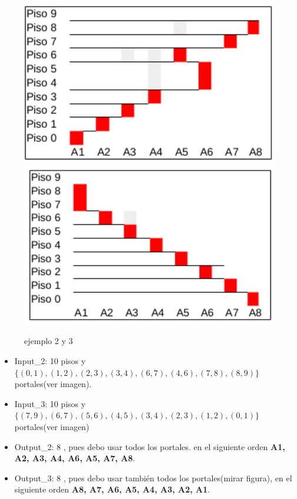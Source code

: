 \begin{figure}[H]
   \centering 
      \includegraphics[scale=0.25]{imagenes/problema1Imagen2.jpg}
      \includegraphics[scale=0.25]{imagenes/problema1Imagen3.jpg}
 \caption{ejemplo 2 y 3}
\end{figure}



\begin{itemize}
    \item Input_2: 10 pisos y $\{(0,1),(1,2),(2,3),(3,4),(6,7),(4,6),(7,8),(8,9)\}$ portales(ver imagen). 
    \item Input_3: 10 pisos y $\{(7,9),(6,7),(5,6),(4,5),(3,4),(2,3),(1,2),(0,1)\}$ portales(ver imagen)
    \item Output_2: 8 , pues debo usar todos los portales. en el siguiente orden \textbf{A1, A2, A3, A4, A6, A5, A7, A8}.  
    \item Output_3: 8 , pues debo usar también todos los portales(mirar figura), en el siguiente orden \textbf{A8, A7, A6, A5, A4, A3, A2, A1}.
\end{itemize}

